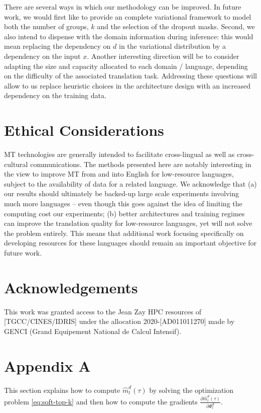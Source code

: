 \documentclass[11pt]{article}
\begin{document}
There are several ways in which our methodology can be improved. In future work, we would first like to provide an complete variational framework to model both the number of groups, $k$ and the selection of the dropout masks. Second, we also intend to dispense with the domain information during inference: this would mean replacing the dependency on $d$ in the variational distribution by a dependency on the input $x$. Another interesting direction will be to consider adapting the size and capacity allocated to each domain / language, depending on the difficulty of the associated translation task. Addressing these questions will allow to us replace heuristic choices in the architecture design with an increased dependency on the training data.

\section{Ethical Considerations}
MT technologies are generally intended to facilitate cross-lingual as well as cross-cultural communications. The methods presented here are notably interesting in the view to improve MT from and into English for low-resource languages, subject to the availability of data for a related language. We acknowledge that (a) our results should ultimately be backed-up large scale experiments involving much more languages -- even though this goes against the idea of limiting the computing cost our experiments; (b) better architectures and training regimes can improve the translation quality for low-resource languages, yet will not solve the problem entirely. This means that additional work focusing specifically on developing resources for these languages should remain an important objective for future work.

\section{Acknowledgements}
This work was granted access to the Jean Zay HPC resources of [TGCC/CINES/IDRIS] under the allocation 2020-[AD011011270] made by GENCI (Grand Equipement National de Calcul Intensif).



\appendix
\section{Appendix A}
\label{appendix:a}
This section explains how to compute $\hat{m}_l^d(\tau)$ by solving the optimization problem \eqref{eq:soft-top-k} and then how to compute the gradients $\frac{\partial \hat{m}_l^d(\tau)}{\partial \Phi_l^d}$.
\end{document}
